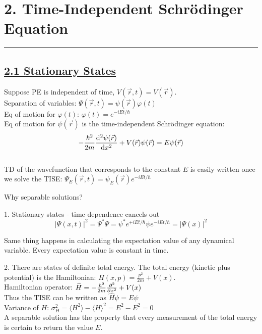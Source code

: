 \section{2. Time-Independent Schr\"{o}dinger Equation} \hrule height 0.3pt \thinspace

\subsection{\underline{2.1 Stationary States}}
Suppose PE is independent of time, $V(\vec{r}, t) = V(\vec{r})$. \\
Separation of variables: $\Psi(\vec{r}, t) = \psi(\vec{r}) \varphi(t)$ \\

Eq of motion for $\varphi(t)$: $\varphi(t) = e^{-iEt/\hbar}$ \\

Eq of motion for $\psi(\vec{r})$ is the time-independent Schr\"{o}dinger equation:
$$-\frac{\hbar^2 }{2m} \dv[2]{\psi(\vec{r})}{x} + V(\vec{r}) \psi(\vec{r}) = E \psi(\vec{r}) $$ \\

TD of the wavefunction that corresponds to the constant $E$ is easily written once we solve the TISE: $\Psi_{E}(\vec{r}, t) = \psi_{E}(\vec{r}) e^{-iEt / \hbar}$ \\

\medskip

Why separable solutions? \\

\smallskip

1. Stationary states - time-dependence cancels out
    $$|\Psi(x,t)|^2 = \Psi^* \Psi = \psi^* e^{+iEt/\hbar} \psi e^{-iEt/\hbar} = |\Psi(x)|^2$$

    Same thing happens in calculating the expectation value of any dynamical variable. Every expectation value is constant in time. \\

\smallskip

2. There are states of definite total energy. The total energy (kinetic plus potential) is the Hamiltonian: $H(x, p) = \frac{p^2}{2m} + V(x)$. \\

Hamiltonian operator: $\widehat{H} = -\frac{\hbar^2}{2m} \pdv[2]{}{x} + V(x)$ \\
Thus the TISE can be written as $\widehat{H} \psi = E \psi$ \\
Variance of $H$: $\sigma_{H}^2 = \langle H^2 \rangle - \langle H \rangle ^2 = E^2 - E^2 = 0$ \\
A separable solution has the property that every measurement of the total energy is certain to return the value $E$. \\


